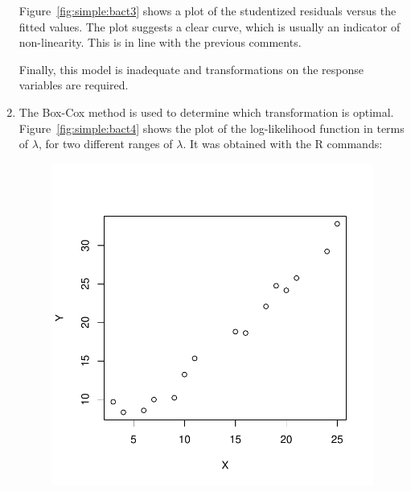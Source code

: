 \begin{solution}{2.22}
\begin{enumerate}
Figure~\ref{fig:simple:bact3} shows a plot of the studentized residuals versus the fitted values. The plot suggests a clear curve, which is usually an indicator of non-linearity. This is in line with the previous comments.

Finally, this model is inadequate and transformations on the response variables are required.

\item The Box-Cox method is used to determine which transformation is optimal. Figure~\ref{fig:simple:bact4} shows the plot of the log-likelihood function in terms of $\lambda$, for two different ranges of $\lambda$. It was obtained with the \textsf{R} commands:
\begin{knitrout}
\color{fgcolor}\begin{kframe}
\begin{alltt}
\hlopt{~}  \hlstd{=} \hlstd{(}\hlopt{-}\hlstd{,} \hlstd{,}  \hlstd{=} \hlstd{),}  \hlstd{=} \hlstd{)}
\hlopt{~}  \hlstd{=} \hlstd{(}\hlopt{-}\hlstd{,} \hlstd{,}  \hlstd{=} \hlstd{),}  \hlstd{=} \hlstd{)}
\end{alltt}
\end{kframe}
\end{knitrout}

\begin{figure}
\begin{center}
\begin{knitrout}
\color{fgcolor}

{\centering \includegraphics[width=.45\linewidth]{figure/fig-unnamed-chunk-36-1}

}




\end{knitrout}
\end{center}
\end{figure}
\end{enumerate}
\end{solution}
